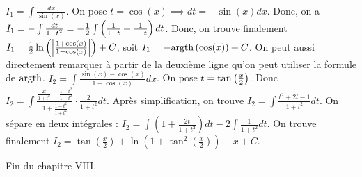 \documentclass[12pt, a4paper]{report}
\begin{document}
\begin{example}
    \begin{outline}[enumerate]
        \1 $I_1=\int \frac{dx}{\sin(x)}$.
        \2 On pose $t=\cos(x)\implies dt=-\sin(x)dx$.
        \2 Donc, on a $I_1 = -\int \frac{dt}{1-t^2} = -\frac12 \int \left(\frac{1}{1-t} + \frac{1}{1+t}\right) dt$.
        \2 Donc, on trouve finalement $I_1 = \frac12 \ln\left(\left|\frac{1+\cos(x)}{1-\cos(x)}\right|\right) + C$, soit $I_1 = -\mathrm{argth}\left(\cos(x)\right) + C$.
        \2 On peut aussi directement remarquer à partir de la deuxième ligne qu'on peut utiliser la formule de $\mathrm{argth}$.
        \1 $I_2=\int \frac{\sin(x)-\cos(x)}{1+\cos(x)}dx$.
        \2 On pose $t=\tan\left(\frac{x}{2}\right)$.
        \2 Donc $I_2 = \int \frac{\frac{2t}{1+t^2} - \frac{1-t^2}{1+t^2}}{1 + \frac{1-t^2}{1+t^2}} \cdot \frac{2}{1+t^2} dt$.
        \2 Après simplification, on trouve $I_2 = \int \frac{t^2+2t-1}{1+t^2} dt$.
        \2 On sépare en deux intégrales : $I_2 = \int (1 + \frac{2t}{1+t^2}) dt - 2\int \frac{1}{1+t^2} dt$.
        \2 On trouve finalement $I_2 = \tan(\frac x2)+\ln(1+\tan^2(\frac x2)) - x + C$.
    \end{outline}
\end{example}

Fin du chapitre VIII.
\end{document}
